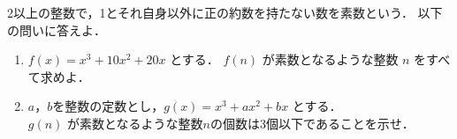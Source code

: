 ﻿\documentclass[../../../uem_mat_tok_q.tex]{subfiles}
\begin{document}
    2以上の整数で，1とそれ自身以外に正の約数を持たない数を素数という．%
    以下の問いに答えよ．

    \begin{enumerate}
        \item $f(x)=x^3+10x^2+20x$ とする．%
            $f(n)$ が素数となるような整数 $n$ をすべて求めよ．
        \item $a$，$b$を整数の定数とし，$g(x)=x^3+ax^2+bx$ とする．\\
            $g(n)$ が素数となるような整数$n$の個数は3個以下であることを示せ．
    \end{enumerate}
\end{document}
